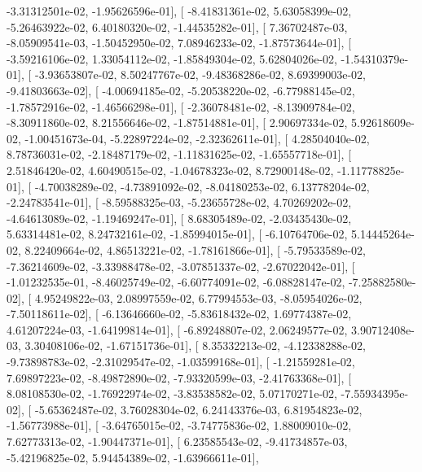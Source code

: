 \documentclass{article}
\begin{document}
         -3.31312501e-02,  -1.95626596e-01],
       [ -8.41831361e-02,   5.63058399e-02,  -5.26463922e-02,
          6.40180320e-02,  -1.44535282e-01],
       [  7.36702487e-03,  -8.05909541e-03,  -1.50452950e-02,
          7.08946233e-02,  -1.87573644e-01],
       [ -3.59216106e-02,   1.33054112e-02,  -1.85849304e-02,
          5.62804026e-02,  -1.54310379e-01],
       [ -3.93653807e-02,   8.50247767e-02,  -9.48368286e-02,
          8.69399003e-02,  -9.41803663e-02],
       [ -4.00694185e-02,  -5.20538220e-02,  -6.77988145e-02,
         -1.78572916e-02,  -1.46566298e-01],
       [ -2.36078481e-02,  -8.13909784e-02,  -8.30911860e-02,
          8.21556646e-02,  -1.87514881e-01],
       [  2.90697334e-02,   5.92618609e-02,  -1.00451673e-04,
         -5.22897224e-02,  -2.32362611e-01],
       [  4.28504040e-02,   8.78736031e-02,  -2.18487179e-02,
         -1.11831625e-02,  -1.65557718e-01],
       [  2.51846420e-02,   4.60490515e-02,  -1.04678323e-02,
          8.72900148e-02,  -1.11778825e-01],
       [ -4.70038289e-02,  -4.73891092e-02,  -8.04180253e-02,
          6.13778204e-02,  -2.24783541e-01],
       [ -8.59588325e-03,  -5.23655728e-02,   4.70269202e-02,
         -4.64613089e-02,  -1.19469247e-01],
       [  8.68305489e-02,  -2.03435430e-02,   5.63314481e-02,
          8.24732161e-02,  -1.85994015e-01],
       [ -6.10764706e-02,   5.14445264e-02,   8.22409664e-02,
          4.86513221e-02,  -1.78161866e-01],
       [ -5.79533589e-02,  -7.36214609e-02,  -3.33988478e-02,
         -3.07851337e-02,  -2.67022042e-01],
       [ -1.01232535e-01,  -8.46025749e-02,  -6.60774091e-02,
         -6.08828147e-02,  -7.25882580e-02],
       [  4.95249822e-03,   2.08997559e-02,   6.77994553e-03,
         -8.05954026e-02,  -7.50118611e-02],
       [ -6.13646660e-02,  -5.83618432e-02,   1.69774387e-02,
          4.61207224e-03,  -1.64199814e-01],
       [ -6.89248807e-02,   2.06249577e-02,   3.90712408e-03,
          3.30408106e-02,  -1.67151736e-01],
       [  8.35332213e-02,  -4.12338288e-02,  -9.73898783e-02,
         -2.31029547e-02,  -1.03599168e-01],
       [ -1.21559281e-02,   7.69897223e-02,  -8.49872890e-02,
         -7.93320599e-03,  -2.41763368e-01],
       [  8.08108530e-02,  -1.76922974e-02,  -3.83538582e-02,
          5.07170271e-02,  -7.55934395e-02],
       [ -5.65362487e-02,   3.76028304e-02,   6.24143376e-03,
          6.81954823e-02,  -1.56773988e-01],
       [ -3.64765015e-02,  -3.74775836e-02,   1.88009010e-02,
          7.62773313e-02,  -1.90447371e-01],
       [  6.23585543e-02,  -9.41734857e-03,  -5.42196825e-02,
          5.94454389e-02,  -1.63966611e-01],
\end{document}
